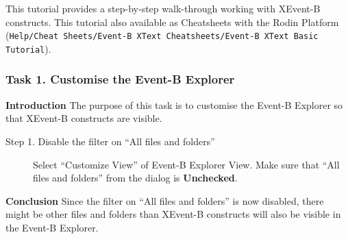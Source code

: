 This tutorial provides a step-by-step walk-through working with XEvent-B constructs. This tutorial also available as Cheatsheets with the Rodin Platform (\texttt{Help/Cheat Sheets/Event-B XText Cheatsheets/Event-B XText Basic Tutorial}).

\subsubsection{Task 1. Customise the Event-B Explorer}
\textbf{Introduction}
The purpose of this task is to customise the Event-B Explorer so that XEvent-B constructs are visible.
\begin{description}
\item[Step 1. Disable the filter on ``All files and folders''] Select ``Customize View'' of Event-B Explorer View. Make sure that ``All files and folders'' from the dialog is \textbf{Unchecked}.
\end{description}

\textbf{Conclusion} Since the filter on ``All files and folders'' is now disabled, there might be other files and folders than XEvent-B constructs will also be visible in the Event-B Explorer.

